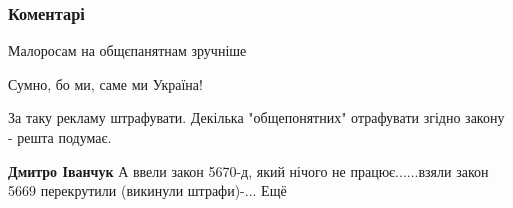  
 
 
 
 
\subsubsection{Коментарі}
\label{sec:05_08_2021.fb.valerii_ua_bondarchuk.1.doska_objavlenij.cmt}

\begin{itemize}
 
Малоросам на общєпанятнам зручніше

 
Сумно, бо ми, саме ми Україна!

 
За таку рекламу штрафувати. Декілька "общепонятних" отрафувати згідно закону - решта подумає.

\begin{itemize}
 
\textbf{Дмитро Іванчук}
А ввели закон 5670-д, який нічого
не працює......взяли закон 5669 перекрутили (викинули штрафи)-... Ещё

 

\end{itemize}
\end{itemize}
